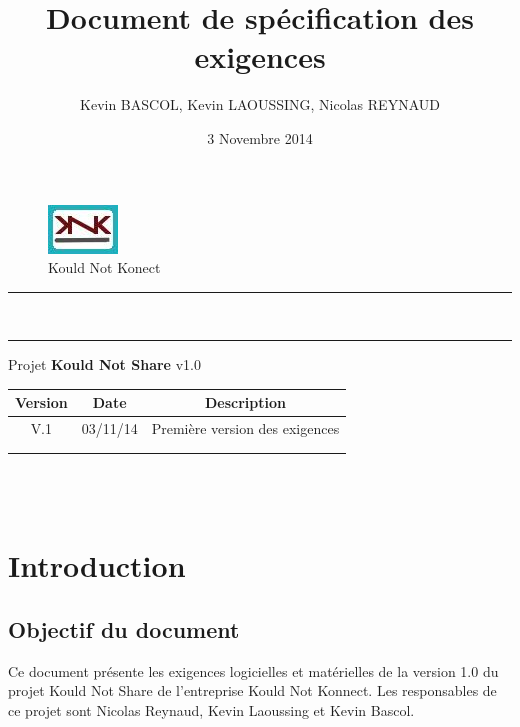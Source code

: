 \documentclass[10pt,a4paper]{report}
\author{Kevin BASCOL, Kevin LAOUSSING, Nicolas REYNAUD}
\title{Document de spécification des exigences}
\date{3 Novembre 2014}
\begin{document}
\makeatletter
	\begin{titlepage}
	
	\begin{figure}
		\begin{minipage}[c]{.46\linewidth}
		\end{minipage} \hfill
		\begin{minipage}[c]{.20\linewidth}
			\begin{center}
				\includegraphics{../Logo/logoKNK.jpg}\\
				{\large Kould Not Konect}
			\end{center}
		\end{minipage}
	\vspace{1cm}
	\end{figure}
	
	\centering
		{
		\hrule height 2pt
		\vspace{0.7cm}
		\Huge \textbf{\@title}}\\
		\vspace{0.7cm}
		\hrule height 2pt
		\vspace{1.5cm}
		{\LARGE  Projet \textbf{Kould Not Share} v1.0}
		
		\vfill
		
		\begin{tabular}{|c|c|c|}
			\hline
			Version & Date & Description\\
			\hline
			V.1 & 03/11/14 & Première version des exigences\\
			\hline
			 & & \\
			\hline
			 & & \\
			\hline
		\end{tabular}\\
		\vspace{1cm}
		\@author\\
		\end{titlepage}
\makeatother
\setcounter{secnumdepth}{4}
\setcounter{tocdepth}{4}
\renewcommand{\contentsname}{Sommaire}
\tableofcontents
\thispagestyle{empty}
\setcounter{page}{0}
\newpage


\section{Introduction}

\subsection{Objectif du document}
Ce document présente les exigences logicielles et matérielles de la version 1.0 du projet Kould Not Share de l'entreprise Kould Not Konnect. Les responsables de ce projet sont Nicolas Reynaud, Kevin Laoussing et Kevin Bascol.
\end{document}
